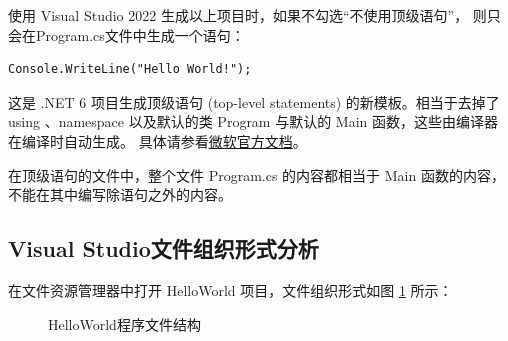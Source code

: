 使用 Visual Studio 2022 生成以上项目时，如果不勾选``不使用顶级语句''，
则只会在Program.cs文件中生成一个语句：

\begin{lstlisting}
Console.WriteLine("Hello World!");
\end{lstlisting}

这是 .NET 6 项目生成顶级语句 (top-level statements) 的新模板。相当于去掉了
using 、namespace 以及默认的类 Program 与默认的 Main 函数，这些由编译器在编译时自动生成。
具体请参看\href{https://docs.microsoft.com/en-us/dotnet/core/tutorials/top-level-templates}{微软官方文档}。

在顶级语句的文件中，整个文件 Program.cs 的内容都相当于 Main 函数的内容，不能在其中编写除语句之外的内容。

\subsection{Visual Studio文件组织形式分析}

在文件资源管理器中打开 HelloWorld 项目，文件组织形式如图 \ref{fig:HelloWorldProj} 所示：

\begin{figure}[htbp]
\centering
{}
\hspace{20pt}%
\caption{HelloWorld程序文件结构}
\label{fig:HelloWorldProj}
\end{figure}

